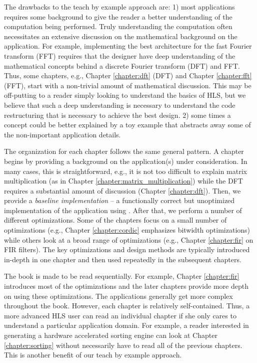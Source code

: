 The drawbacks to the teach by example approach are: 1) most applications requires some background to give the reader a better understanding of the computation being performed. Truly understanding the computation often necessitates an extensive discussion on the mathematical background on the application. For example, implementing the best architecture for the fast Fourier transform (FFT) requires that the designer have deep understanding of the mathematical concepts behind a discrete Fourier transform (DFT) and FFT. Thus, some chapters, e.g., Chapter \ref{chapter:dft} (DFT) and Chapter \ref{chapter:fft} (FFT), start with a non-trivial amount of mathematical discussion. This may be off-putting to a reader simply looking to understand the basics of HLS, but we believe that such a deep understanding is necessary to understand the code restructuring that is necessary to achieve the best design. 2) some times a concept could be better explained by a toy example that abstracts away some of the non-important application details. 

The organization for each chapter follows the same general pattern. A chapter begins by providing a background on the application(s) under consideration. In many cases, this is straightforward, e.g., it is not too difficult to explain matrix multiplication (as in Chapter \ref{chapter:matrix_multiplication}) while the DFT requires a substantial amount of discussion (Chapter \ref{chapter:dft}). Then, we provide a \emph{baseline implementation} -- a functionally correct but unoptimized implementation of the application using \VHLS. After that, we perform a number of different optimizations. Some of the chapters focus on a small number of optimizations (e.g., Chapter \ref{chapter:cordic} emphasizes bitwidth optimizations) while others look at a broad range of optimizations (e.g., Chapter \ref{chapter:fir} on FIR filters). The key optimizations and design methods are typically introduced in-depth in one chapter and then used repeatedly in the subsequent chapters. 

The book is made to be read sequentially. For example, Chapter \ref{chapter:fir} introduces most of the optimizations and the later chapters provide more depth on using these optimizations. The applications generally get more complex throughout the book. However, each chapter is relatively self-contained. Thus, a more advanced HLS user can read an individual chapter if she only cares to understand a particular application domain. For example, a reader interested in generating a hardware accelerated sorting engine can look at Chapter \ref{chapter:sorting} without necessarily have to read all of the previous chapters. This is another benefit of our teach by example approach.



